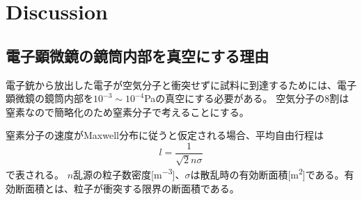 \documentclass[a4paper,11pt]{jsarticle}
\begin{document}


\section{Discussion}
\subsection{電子顕微鏡の鏡筒内部を真空にする理由}
電子銃から放出した電子が空気分子と衝突せずに試料に到達するためには、電子顕微鏡の鏡筒内部を$10^{-3}\sim 10^{-4}$Paの真空にする必要がある。
空気分子の8割は窒素なので簡略化のため窒素分子で考えることにする。

窒素分子の速度がMaxwell分布に従うと仮定される場合、平均自由行程は
\begin{equation}
  l = \frac{1}{\sqrt{2}n\sigma}
\end{equation}
で表される。
$n$乱源の粒子数密度[\si{m^{-3}}]、$\sigma$は散乱時の有効断面積[\si{m^2}]である。有効断面積とは、粒子が衝突する限界の断面積である。
\end{document}
